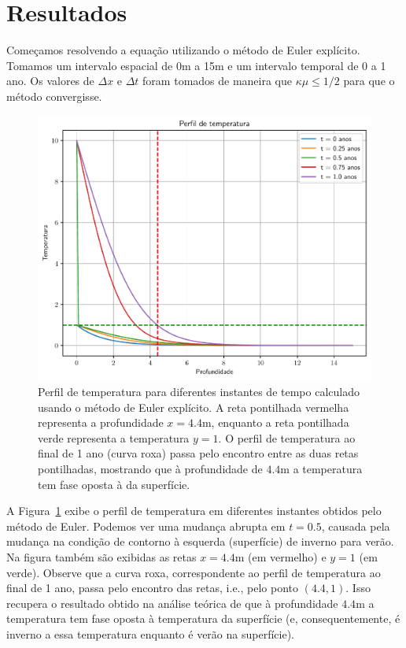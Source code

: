 \documentclass[twocolumn,showpacs,%
  nofootinbib,aps,superscriptaddress,%
  eqsecnum,prd,notitlepage,showkeys,10pt]{revtex4-1} %
\renewcommand{\leq}{\leqslant}
\begin{document}
\section{Resultados}
%
	Começamos resolvendo a equação utilizando o método de Euler explícito.
	Tomamos um intervalo espacial de 0m a 15m e um intervalo temporal de 0 a 1 ano.
	Os valores de $\Delta x$ e $\Delta t$ foram tomados de maneira que $\kappa\mu \leq 1/2$
	para que o método convergisse.
	\begin{figure}[t]%
		\label{fig:exp-euler}
		\includegraphics[width=.45\textwidth]{Codes/exp-euler.pdf}
		\caption{Perfil de temperatura para diferentes instantes de tempo calculado usando
		o método de Euler explícito. A reta pontilhada
		vermelha representa a profundidade $x = 4.4$m, enquanto a reta pontilhada verde
		representa a temperatura $y=1$. O perfil de temperatura ao final de 1 ano (curva roxa)
		passa pelo encontro entre as duas retas pontilhadas, mostrando que à profundidade
		de $4.4$m a temperatura tem fase oposta à da superfície.}
	\end{figure}
	A Figura~\ref{fig:exp-euler} exibe o perfil de temperatura em diferentes instantes
	obtidos pelo método de Euler.
	Podemos ver uma mudança abrupta em $t=0.5$, causada pela mudança na condição de contorno
	à esquerda (superfície) de inverno para verão. Na figura também são exibidas as retas 
	$x=4.4$m (em vermelho) e $y=1$ (em verde). Observe que a curva roxa, correspondente
	ao perfil de temperatura ao final de 1 ano, passa pelo encontro das retas, i.e.,
	pelo ponto $(4.4, 1)$. Isso recupera o resultado obtido na análise teórica de que
	à profundidade $4.4$m a temperatura tem fase oposta à temperatura da superfície
	(e, consequentemente, é inverno a essa temperatura enquanto é verão na superfície).
	
\end{document}
